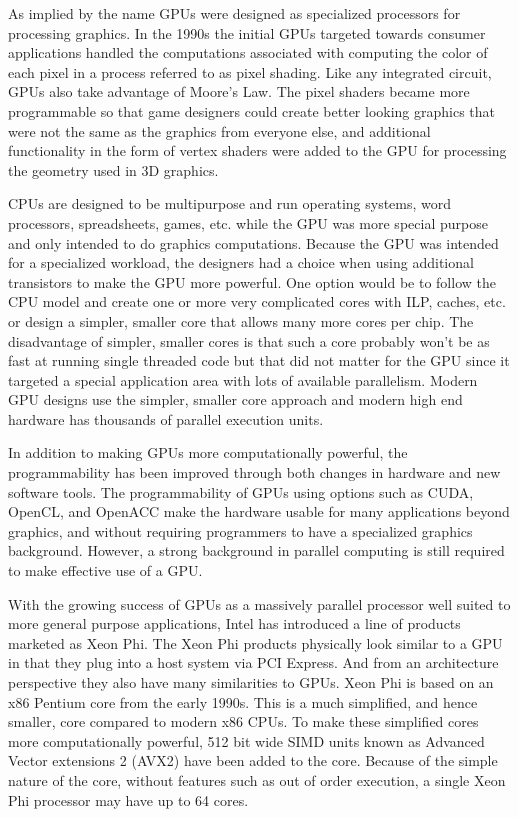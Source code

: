 \documentclass{JINST}
\begin{document}
As implied by the name GPUs were designed as specialized processors for processing graphics.  In the 1990s the initial GPUs targeted towards consumer applications handled the computations associated with computing the color of each pixel in a process referred to as pixel shading.  Like any integrated circuit, GPUs also take advantage of Moore's Law.  The pixel shaders became more programmable so that game designers could create better looking graphics that were not the same as the graphics from everyone else, and additional functionality in the form of vertex shaders were added to the GPU for processing the geometry used in 3D graphics.

CPUs are designed to be multipurpose and run operating systems, word processors, spreadsheets, games, etc. while the GPU was more special purpose and only intended to do graphics computations.  Because the GPU was intended for a specialized workload, the designers had a choice when using additional transistors to make the GPU more powerful.  One option would be to follow the CPU model and create one or more very complicated cores with ILP, caches, etc. or design a simpler, smaller core that allows many more cores per chip.  The disadvantage of simpler, smaller cores is that such a core probably won't be as fast at running single threaded code but that did not matter for the GPU since it targeted a special application area with lots of available parallelism.  Modern GPU designs use the simpler, smaller core approach and modern high end hardware has thousands of parallel execution units.

In addition to making GPUs more computationally powerful, the programmability has been improved through both changes in hardware and new software tools.  The programmability of GPUs using options such as CUDA, OpenCL, and OpenACC make the hardware usable for many applications beyond graphics, and without requiring programmers to have a specialized graphics background.  However, a strong background in parallel computing is still required to make effective use of a GPU.

With the growing success of GPUs as a massively parallel processor well suited to more general purpose applications, Intel has introduced a line of products marketed as Xeon Phi.  The Xeon Phi products physically look similar to a GPU in that they plug into a host system via PCI Express.  And from an architecture perspective they also have many similarities to GPUs.  Xeon Phi is based on an x86 Pentium core from the early 1990s.  This is a much simplified, and hence smaller, core compared to modern x86 CPUs.  To make these simplified cores more computationally powerful, 512 bit wide SIMD units known as Advanced Vector extensions 2 (AVX2) have been added to the core.  Because of the simple nature of the core, without features such as out of order execution, a single Xeon Phi processor may have up to 64 cores.
\end{document}
